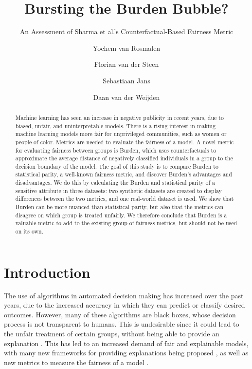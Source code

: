 \documentclass[runningheads]{llncs}
\begin{document}
\title{Bursting the Burden Bubble?}
\subtitle{An Assessment of Sharma et al.'s Counterfactual-Based Fairness Metric}

\author{
Yochem van Rosmalen
\and
Florian van der Steen
\and
Sebastiaan Jans
\and
Daan van der Weijden
}



\maketitle

\begin{abstract}
Machine learning has seen an increase in negative publicity in recent years, due to biased, unfair, and uninterpretable models. There is a rising interest in making machine learning models more fair for unprivileged communities, such as women or people of color. Metrics are needed to evaluate the fairness of a model. A novel metric for evaluating fairness between groups is Burden, which uses counterfactuals to approximate the average distance of negatively classified individuals in a group to the decision boundary of the model. The goal of this study is to compare Burden to statistical parity, a well-known fairness metric, and discover Burden's advantages and disadvantages. We do this by calculating the Burden and statistical parity of a sensitive attribute in three datasets: two synthetic datasets are created to display differences between the two metrics, and one real-world dataset is used. We show that Burden can be more nuanced than statistical parity, but also that the metrics can disagree on which group is treated unfairly. We therefore conclude that Burden is a valuable metric to add to the existing group of fairness metrics, but should not be used on its own.
\end{abstract}

\section{Introduction}

The use of algorithms in automated decision making has increased over the past years, due to the increased accuracy in which they can predict or classify desired outcomes. However, many of these algorithms are black boxes, whose decision process is not transparent to humans. This is undesirable since it could lead to the unfair treatment of certain groups, without being able to provide an explanation \cite{angwin2016machine}. This has led to an increased demand of fair and explainable models, with many new frameworks for providing explanations being proposed \cite{lundberg2017shap,ribeiro2016lime,ribeiro2018anchors}, as well as new metrics to measure the fairness of a model \cite{kamiran2009demographicparity,hardt2016equalisedodds,woodworth2017learning}.
\end{document}
